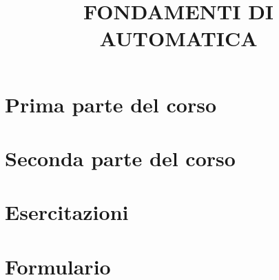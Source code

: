\documentclass[a4paper, 9pt]{article}
\title{FONDAMENTI DI AUTOMATICA}
\begin{document}
    \maketitle
    \tableofcontents{}
    \newpage
    \part{Prima parte del corso}
    
    
    
    
    
    
    
    
    
    
    
    \newpage
    \part{Seconda parte del corso}
    
    
    
    
    
    
    
    
    
    
    
    
    
    
    
    
    
    
    
    
    
    
    \newpage
    \part{Esercitazioni}
    
    
    
    
    
    
    
    \newpage
    \part{Formulario}
    
\end{document}
